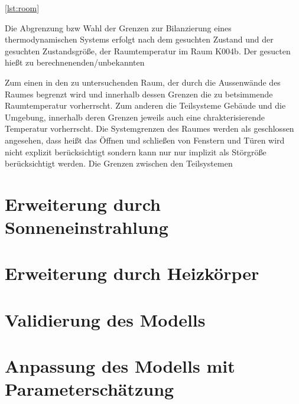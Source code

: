 \ref{lst:room}

Die Abgrenzung bzw Wahl der Grenzen zur Bilanzierung eines thermodynamischen Systems erfolgt nach dem gesuchten Zustand und der gesuchten Zustandsgröße, der Raumtemperatur im Raum K004b. Der gesucten hießt zu berechnenenden/unbekannten

Zum einen in den zu untersuchenden Raum, der durch die Aussenwände des Raumes begrenzt wird und innerhalb dessen Grenzen die zu betsimmende Raumtemperatur vorherrscht. Zum anderen die Teilsysteme Gebäude und die Umgebung, innerhalb deren Grenzen jeweils auch eine chrakterisierende Temperatur vorherrscht. Die Systemgrenzen des Raumes werden als geschlossen angesehen, dass heißt das Öffnen und schließen von Fenstern und Türen wird nicht explizit berücksichtigt sondern kann nur nur implizit als Störgröße berücksichtigt werden. Die Grenzen zwischen den Teilsystemen 


\section{Erweiterung durch Sonneneinstrahlung}


\section{Erweiterung durch Heizkörper}

\section{Validierung des Modells}

\section{Anpassung des Modells mit Parameterschätzung}